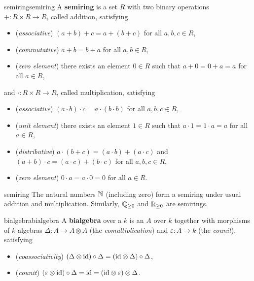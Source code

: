 \begin{topic}{semiring}{semiring}
    A \textbf{semiring} is a set $R$ with two binary operations $+ : R \times R \to R$, called addition, satisfying
    \begin{itemize}
        \item (\textit{associative}) $(a + b) + c = a + (b + c)$ for all $a, b, c \in R$,
        \item (\textit{commutative}) $a + b = b + a$ for all $a, b \in R$,
        \item (\textit{zero element}) there exists an element $0 \in R$ such that $a + 0 = 0 + a = a$ for all $a \in R$,
    \end{itemize}
    and $\cdot : R \times R \to R$, called multiplication, satisfying
    \begin{itemize}
        \item (\textit{associative}) $(a \cdot b) \cdot c = a \cdot (b \cdot b)$ for all $a, b, c \in R$,
        \item (\textit{unit element}) there exists an element $1 \in R$ such that $a \cdot 1 = 1 \cdot a = a$ for all $a \in R$,
        \item (\textit{distributive}) $a \cdot (b + c) = (a \cdot b) + (a \cdot c)$ and $(a + b) \cdot c = (a \cdot c) + (b \cdot c)$ for all $a, b, c \in R$,
        \item (\textit{zero element}) $0 \cdot a = a \cdot 0 = 0$ for all $a \in R$.
    \end{itemize}
\end{topic}

\begin{example}{semiring}
    The natural numbers $\mathbb{N}$ (including zero) form a semiring under usual addition and multiplication. Similarly, $\mathbb{Q}_{\ge 0}$ and $\mathbb{R}_{\ge 0}$ are semirings.
\end{example}

\begin{topic}{bialgebra}{bialgebra}
    A \textbf{bialgebra} over a  $k$ is an  $A$ over $k$ together with morphisms of $k$-algebras $\Delta : A \to A \otimes A$ (the \textit{comultiplication}) and $\varepsilon : A \to k$ (the \textit{counit}), satisfying
    \begin{itemize}
        \item (\textit{coassociativity}) $(\Delta \otimes \text{id}) \circ \Delta = (\text{id} \otimes \Delta) \circ \Delta$,
        \item (\textit{counit}) $(\varepsilon \otimes \text{id}) \circ \Delta = \text{id} = (\text{id} \otimes \varepsilon) \otimes \Delta$.
    \end{itemize}
\end{topic}

